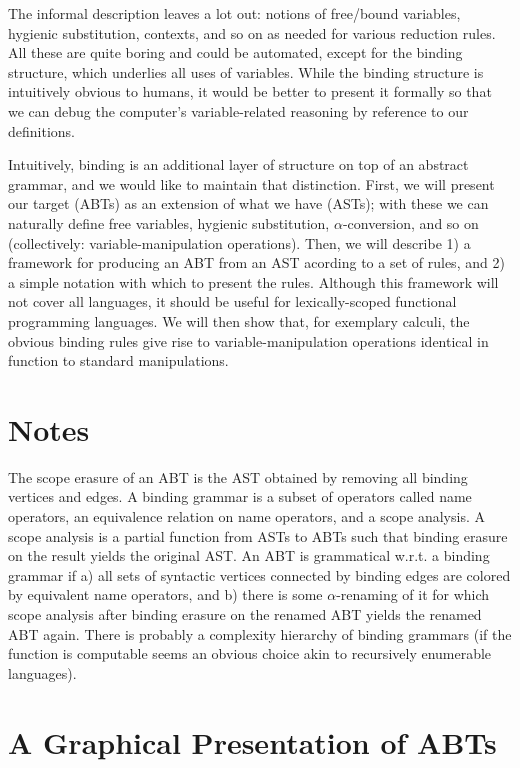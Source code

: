 \documentclass[11pt]{article} %
\theoremstyle{definition}
\begin{document}
The informal description leaves a lot out: notions of free/bound variables, hygienic substitution, contexts, and so on as needed for various reduction rules.
All these are quite boring and could be automated, except for the binding structure, which underlies all uses of variables.
While the binding structure is intuitively obvious to humans, it would be better to present it formally so that we can debug the computer's variable-related reasoning by reference to our definitions.

Intuitively, binding is an additional layer of structure on top of an abstract grammar, and we would like to maintain that distinction.
First, we will present our target (ABTs) as an extension of what we have (ASTs); with these we can naturally define free variables, hygienic substitution, $\alpha$-conversion, and so on (collectively: variable-manipulation operations).
Then, we will describe 1) a framework for producing an ABT from an AST acording to a set of rules, and 2) a simple notation with which to present the rules.
Although this framework will not cover all languages, it should be useful for lexically-scoped functional programming languages.
We will then show that, for exemplary calculi, the obvious binding rules give rise to variable-manipulation operations identical in function to standard manipulations.

\section*{Notes}

The scope erasure of an ABT is the AST obtained by removing all binding vertices and edges.
A binding grammar is a subset of operators called name operators, an equivalence relation on name operators, and a scope analysis.
A scope analysis is a partial function from ASTs to ABTs such that binding erasure on the result yields the original AST.
An ABT is grammatical w.r.t. a binding grammar if a) all sets of syntactic vertices connected by binding edges are colored by equivalent name operators, and b) there is some $\alpha$-renaming of it for which scope analysis after binding erasure on the renamed ABT yields the renamed ABT again.
There is probably a complexity hierarchy of binding grammars (if the function is computable seems an obvious choice akin to recursively enumerable languages).


\section{A Graphical Presentation of ABTs}
\end{document}
